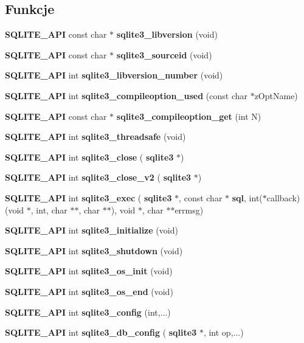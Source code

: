 \subsection*{Funkcje}
\begin{DoxyCompactItemize}
\item 
\textbf{ S\+Q\+L\+I\+T\+E\+\_\+\+A\+PI} const char $\ast$ \textbf{ sqlite3\+\_\+libversion} (void)
\item 
\textbf{ S\+Q\+L\+I\+T\+E\+\_\+\+A\+PI} const char $\ast$ \textbf{ sqlite3\+\_\+sourceid} (void)
\item 
\textbf{ S\+Q\+L\+I\+T\+E\+\_\+\+A\+PI} int \textbf{ sqlite3\+\_\+libversion\+\_\+number} (void)
\item 
\textbf{ S\+Q\+L\+I\+T\+E\+\_\+\+A\+PI} int \textbf{ sqlite3\+\_\+compileoption\+\_\+used} (const char $\ast$z\+Opt\+Name)
\item 
\textbf{ S\+Q\+L\+I\+T\+E\+\_\+\+A\+PI} const char $\ast$ \textbf{ sqlite3\+\_\+compileoption\+\_\+get} (int N)
\item 
\textbf{ S\+Q\+L\+I\+T\+E\+\_\+\+A\+PI} int \textbf{ sqlite3\+\_\+threadsafe} (void)
\item 
\textbf{ S\+Q\+L\+I\+T\+E\+\_\+\+A\+PI} int \textbf{ sqlite3\+\_\+close} (\textbf{ sqlite3} $\ast$)
\item 
\textbf{ S\+Q\+L\+I\+T\+E\+\_\+\+A\+PI} int \textbf{ sqlite3\+\_\+close\+\_\+v2} (\textbf{ sqlite3} $\ast$)
\item 
\textbf{ S\+Q\+L\+I\+T\+E\+\_\+\+A\+PI} int \textbf{ sqlite3\+\_\+exec} (\textbf{ sqlite3} $\ast$, const char $\ast$\textbf{ sql}, int($\ast$callback)(void $\ast$, int, char $\ast$$\ast$, char $\ast$$\ast$), void $\ast$, char $\ast$$\ast$errmsg)
\item 
\textbf{ S\+Q\+L\+I\+T\+E\+\_\+\+A\+PI} int \textbf{ sqlite3\+\_\+initialize} (void)
\item 
\textbf{ S\+Q\+L\+I\+T\+E\+\_\+\+A\+PI} int \textbf{ sqlite3\+\_\+shutdown} (void)
\item 
\textbf{ S\+Q\+L\+I\+T\+E\+\_\+\+A\+PI} int \textbf{ sqlite3\+\_\+os\+\_\+init} (void)
\item 
\textbf{ S\+Q\+L\+I\+T\+E\+\_\+\+A\+PI} int \textbf{ sqlite3\+\_\+os\+\_\+end} (void)
\item 
\textbf{ S\+Q\+L\+I\+T\+E\+\_\+\+A\+PI} int \textbf{ sqlite3\+\_\+config} (int,...)
\item 
\textbf{ S\+Q\+L\+I\+T\+E\+\_\+\+A\+PI} int \textbf{ sqlite3\+\_\+db\+\_\+config} (\textbf{ sqlite3} $\ast$, int op,...)
\item 
$$
\end{DoxyCompactItemize}
